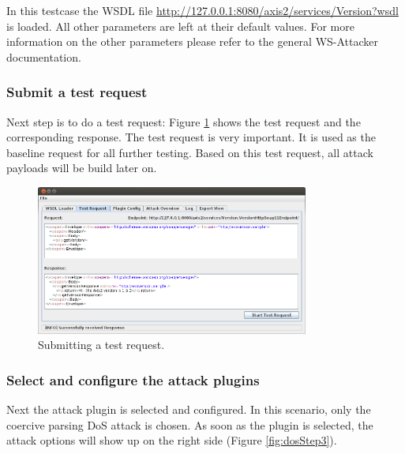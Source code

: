 In this testcase the WSDL file \url{http://127.0.0.1:8080/axis2/services/Version?wsdl} is loaded. All other parameters are left at their default values. 
For more information on the other parameters please refer to the general WS-Attacker documentation.

\subsubsection{Submit a test request}
\label{sec:submitting_a_test_request}
Next step is to do a test request: Figure \ref{fig:dosStep2} shows
the test request and the corresponding response. 
The test request is very important. It is used as the baseline request for all further testing. 
Based on this test request, all attack payloads will be build later on.

\begin{figure}[h!]
    \begin{center}
        \includegraphics[width=0.8\textwidth]{img//dosStep2}
    \end{center}
    \caption{Submitting a test request.}
    \label{fig:dosStep2}
\end{figure}

\subsubsection{Select and configure the attack plugins}
\label{sec:attack_plugin_configuration}

Next the attack plugin is selected and configured. In this scenario, only the coercive parsing DoS attack
is chosen. As soon as the plugin is selected, the attack options will show up on the right side (Figure \ref{fig:dosStep3}). 

